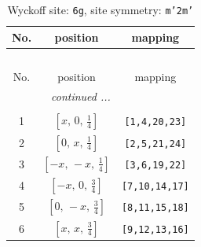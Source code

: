 \documentclass[fleqn,8pt]{jsarticle}
\begin{document}
\renewcommand{\arraystretch}{1.2}
\begin{longtable}{ccc}
\caption{Wyckoff site: {\tt 6g}, site symmetry: {\tt m'2m'}}
 \\
 \hline \hline
No. & position & mapping \\ \hline \endfirsthead

\multicolumn{2}{l}{\tablename\ \thetable{}} \\
 \hline \hline
No. & position & mapping \\ \hline \endhead

 \hline \hline
\multicolumn{2}{r}{\footnotesize\it continued ...} \\ \endfoot

 \hline \hline
\multicolumn{2}{r}{} \\ \endlastfoot

1 & $\left[ x,\, 0,\, \frac{1}{4} \right]$ & {\tt [1,4,20,23]} \\ \hline
2 & $\left[ 0,\, x,\, \frac{1}{4} \right]$ & {\tt [2,5,21,24]} \\ \hline
3 & $\left[ - x,\, - x,\, \frac{1}{4} \right]$ & {\tt [3,6,19,22]} \\ \hline
4 & $\left[ - x,\, 0,\, \frac{3}{4} \right]$ & {\tt [7,10,14,17]} \\ \hline
5 & $\left[ 0,\, - x,\, \frac{3}{4} \right]$ & {\tt [8,11,15,18]} \\ \hline
6 & $\left[ x,\, x,\, \frac{3}{4} \right]$ & {\tt [9,12,13,16]} \\
\end{longtable}
\renewcommand{\arraystretch}{1.2}
\end{document}
